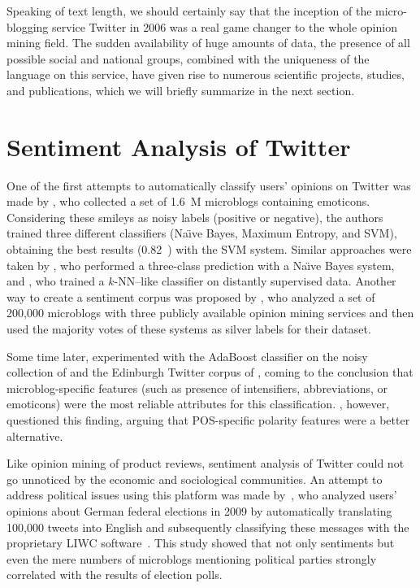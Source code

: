 
Speaking of text length, we should certainly say that the inception of
the micro-blogging service Twitter in 2006 was a real game changer to
the whole opinion mining field.  The sudden availability of huge
amounts of data, the presence of all possible social and national
groups, combined with the uniqueness of the language on this service,
have given rise to numerous scientific projects, studies, and
publications, which we will briefly summarize in the next section.

\section{Sentiment Analysis of Twitter}\label{snt:subsec:intro:saot}

One of the first attempts to automatically classify users' opinions on
Twitter was made by \citet{Go:09}, who collected a set of 1.6~M
microblogs containing emoticons.  Considering these smileys as noisy
labels (positive or negative), the authors trained three different
classifiers (Na\"{\i}ve Bayes, Maximum Entropy, and SVM), obtaining
the best results (0.82~\F{}) with the SVM system.  Similar approaches
were taken by \citet{Pak:10}, who performed a three-class prediction
with a Na\"{\i}ve Bayes system, and \citet{Davidov:10}, who trained a
$k$-NN--like classifier on distantly supervised data. Another way to
create a sentiment corpus was proposed by \citet{Barbosa:10}, who
analyzed a set of 200,000 microblogs with three publicly available
opinion mining services and then used the majority votes of these
systems as silver labels for their dataset.

Some time later, \citet{Kouloumpis:11} experimented with the AdaBoost
classifier on the noisy collection of \citet{Go:09} and the Edinburgh
Twitter corpus of \citet{Petrovic:10}, coming to the conclusion that
microblog-specific features (such as presence of intensifiers,
abbreviations, or emoticons) were the most reliable attributes for
this classification.  \citet{Agarwal:11}, however, questioned this
finding, arguing that POS-specific polarity features were a better
alternative.

Like opinion mining of product reviews, sentiment analysis of Twitter
could not go unnoticed by the economic and sociological communities.
An attempt to address political issues using this platform was made
by~\citet{Tumasjan:10}, who analyzed users' opinions about German
federal elections in 2009 by automatically translating 100,000 tweets
into English and subsequently classifying these messages with the
proprietary LIWC software~\cite{Pannebaker:07}.  This study showed
that not only sentiments but even the mere numbers of microblogs
mentioning political parties strongly correlated with the results of
election polls.

